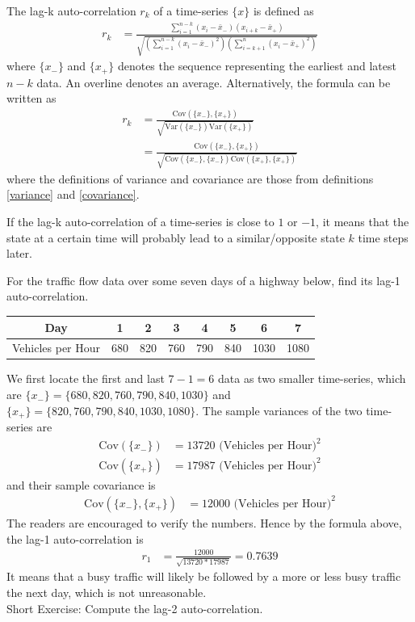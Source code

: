 \begin{defn}
\label{1403}
The lag-k auto-correlation $r_k$ of a time-series $\{x\}$ is defined as
\begin{align*}
r_k &= \frac{\sum_{i=1}^{n-k}(x_i - \bar{x}_{-})(x_{i+k} - \bar{x}_{+})}{\sqrt{(\sum_{i=1}^{n-k}(x_i - \bar{x}_{-})^2) (\sum_{i=k+1}^{n}(x_i - \bar{x}_{+})^2)}}
\end{align*}
where $\{x_{-}\}$ and $\{x_{+}\}$ denotes the sequence representing the earliest and latest $n-k$ data. An overline denotes an average. Alternatively, the formula can be written as
\begin{align*}
r_k &= \frac{\text{Cov}(\{x_{-}\},\{x_{+}\})}{\sqrt{\text{Var}(\{x_{-}\}) \text{Var}(\{x_{+}\})}} \\
&= \frac{\text{Cov}(\{x_{-}\},\{x_{+}\})}{\sqrt{\text{Cov}(\{x_{-}\}, \{x_{-}\}) \text{Cov}(\{x_{+}\}, \{x_{+}\})}}
\end{align*}
where the definitions of variance and covariance are those from definitions \ref{variance} and \ref{covariance}.
\end{defn}
If the lag-k auto-correlation of a time-series is close to $1$ or $-1$, it means that the state at a certain time will probably lead to a similar/opposite state $k$ time steps later.

\begin{exmp}
For the traffic flow data over some seven days of a highway below, find its lag-1 auto-correlation.
\begin{center}
\begin{tabular}{|c|c|c|c|c|c|c|c|}
\hline
Day & 1 & 2 & 3 & 4 & 5 & 6 & 7 \\
\hline
Vehicles per Hour & 680 & 820 & 760 & 790 & 840 & 1030 & 1080 \\
\hline
\end{tabular}
\end{center}
We first locate the first and last $7-1 = 6$ data as two smaller time-series, which are $\{x_-\} = \{680, 820, 760, 790, 840, 1030\}$ and $\{x_+\} = \{820, 760, 790, 840, 1030, 1080\}$. The sample variances of the two time-series are
\begin{align*}
\text{Cov}(\{x_-\}) &= 13720 \text{ (Vehicles per Hour)}^2 \\
\text{Cov}(\{x_+\}) &= 17987 \text{ (Vehicles per Hour)}^2
\end{align*}
and their sample covariance is
\begin{align*}
\text{Cov}(\{x_{-}\},\{x_{+}\}) &= 12000 \text{ (Vehicles per Hour)}^2
\end{align*}
The readers are encouraged to verify the numbers. Hence by the formula above, the lag-1 auto-correlation is
\begin{align*}
r_1 &= \frac{12000}{\sqrt{13720*17987}} = 0.7639
\end{align*}
It means that a busy traffic will likely be followed by a more or less busy traffic the next day, which is not unreasonable.\\
Short Exercise: Compute the lag-2 auto-correlation.
\end{exmp}

